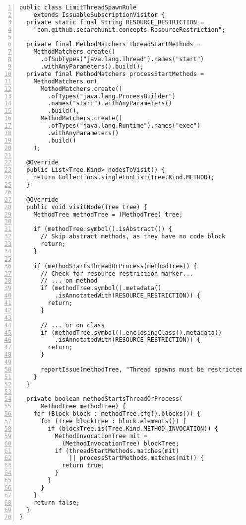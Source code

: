 \begin{lstlisting}[caption={Constraint 5.}, captionpos=b, label=lst:sq_5, numbers=left, showstringspaces=false]
public class LimitThreadSpawnRule
    extends IssuableSubscriptionVisitor {
  private static final String RESOURCE_RESTRICTION =
    "com.github.secarchunit.concepts.ResourceRestriction";

  private final MethodMatchers threadStartMethods =
    MethodMatchers.create()
      .ofSubTypes("java.lang.Thread").names("start")
      .withAnyParameters().build();
  private final MethodMatchers processStartMethods =
    MethodMatchers.or(
      MethodMatchers.create()
        .ofTypes("java.lang.ProcessBuilder")
        .names("start").withAnyParameters()
        .build(),
      MethodMatchers.create()
        .ofTypes("java.lang.Runtime").names("exec")
        .withAnyParameters()
        .build()
    );

  @Override
  public List<Tree.Kind> nodesToVisit() {
    return Collections.singletonList(Tree.Kind.METHOD);
  }

  @Override
  public void visitNode(Tree tree) {
    MethodTree methodTree = (MethodTree) tree;

    if (methodTree.symbol().isAbstract()) {
      // Skip abstract methods, as they have no code block
      return;
    }

    if (methodStartsThreadOrProcess(methodTree)) {
      // Check for resource restriction marker...
      // ... on method
      if (methodTree.symbol().metadata()
          .isAnnotatedWith(RESOURCE_RESTRICTION)) {
        return;
      }

      // ... or on class
      if (methodTree.symbol().enclosingClass().metadata()
          .isAnnotatedWith(RESOURCE_RESTRICTION)) {
        return;
      }

      reportIssue(methodTree, "Thread spawns must be restricted");
    }
  }

  private boolean methodStartsThreadOrProcess(
      MethodTree methodTree) {
    for (Block block : methodTree.cfg().blocks()) {
      for (Tree blockTree : block.elements()) {
        if (blockTree.is(Tree.Kind.METHOD_INVOCATION)) {
          MethodInvocationTree mit =
            (MethodInvocationTree) blockTree;
          if (threadStartMethods.matches(mit)
              || processStartMethods.matches(mit)) {
            return true;
          }
        }
      }
    }
    return false;
  }
}
\end{lstlisting}